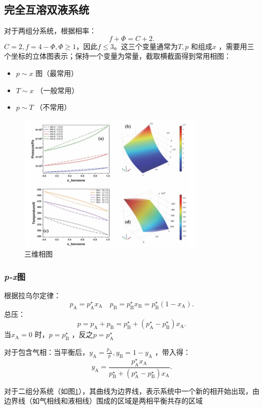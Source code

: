\subsection{完全互溶双液系统}%
\label{sub:完全互溶双液系统}
对于两组分系统，根据相率：
\[
    f + \Phi = C+2
.\]
$C=2, f=4-\Phi, \Phi\ge 1$，因此$f\le 3$。这三个变量通常为$T,p$ 和组成$x$ ，需要用三个坐标的立体图表示；保持一个变量为常量，截取横截面得到常用相图：
\begin{itemize}
    \item $p\sim x$ 图（最常用）
    \item $T\sim x$ （一般常用）
    \item $p\sim T$ （不常用）
\end{itemize}
\begin{figure}[htpb]
    \centering
    \includegraphics[width=0.8\textwidth]{./figures/三维相图.jpg}
    \caption{三维相图}
    \label{fig:-figures-三维相图-jpg}
\end{figure}
\subsubsection{\textit{p-x}图}%
\label{subsub:-textit-p-x-图}
根据拉乌尔定律：\[
    p_\text{A} = p^\star_\text{A} x_\text{A}\quad p_\text{B} = p_\text{B}^\star x_\text{B} = p_\text{B}^\star \left( 1-x_\text{A} \right)
.\]
总压：\[
    p = p_\text{A} + p_\text{B} = p_\text{B}^\star +\left( p_\text{A}^\star -p_\text{B}^\star  \right)x_\text{A}
.\]
当$x_\text{A} = 0$ 时，$p = p^\star _\text{B}$ ，反之$p = p^\star _\text{A}$ 
\begin{notation}
    对于包含气相：当平衡后，$y_\text{A} = \frac{p_\text{A}}{p}, y_\text{B} = 1-y_\text{A}$ ，带入得：\[
        y_\text{A} = \frac{p_\text{A}^\star x_\text{A}}{p_\text{B}^\star +\left( p_\text{A}^\star -p_\text{B}^\star  \right)x_\text{A}}
    .\]
\end{notation}
对于二组分系统（如图\ref{fig:-figures-三维相图-jpg}），其曲线为边界线，表示系统中一个新的相开始出现，由边界线（如气相线和液相线）围成的区域是两相平衡共存的区域
